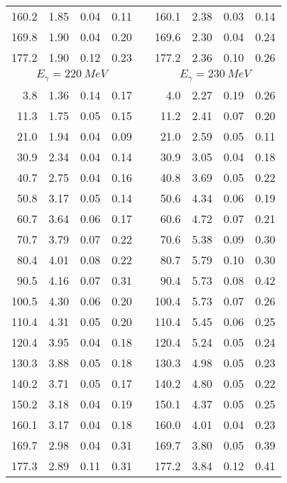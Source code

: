 \begin{table}[htbp]
\begin{center}
\begin{tabular}{|r|r|c|c|l|r|r|c|c|}
160.2 &  1.85 &  0.04 &  0.11 & & 160.1 &  2.38 &  0.03 &  0.14 \\ 
169.8 &  1.90 &  0.04 &  0.20 & & 169.6 &  2.30 &  0.04 &  0.24 \\ 
177.2 &  1.90 &  0.12 &  0.23 & & 177.2 &  2.36 &  0.10 &  0.26 \\ 
\hline 
\hline 
\multicolumn{4}{|c|}{ $E_{\gamma}=220~MeV$} & & 
\multicolumn{4}{c|}{ $E_{\gamma}=230~MeV$} \\ 
\cline{1-4} 
\cline{6-9} 
  3.8 &  1.36 &  0.14 &  0.17 & &   4.0 &  2.27 &  0.19 &  0.26 \\ 
 11.3 &  1.75 &  0.05 &  0.15 & &  11.2 &  2.41 &  0.07 &  0.20 \\ 
 21.0 &  1.94 &  0.04 &  0.09 & &  21.0 &  2.59 &  0.05 &  0.11 \\ 
 30.9 &  2.34 &  0.04 &  0.14 & &  30.9 &  3.05 &  0.04 &  0.18 \\ 
 40.7 &  2.75 &  0.04 &  0.16 & &  40.8 &  3.69 &  0.05 &  0.22 \\ 
 50.8 &  3.17 &  0.05 &  0.14 & &  50.6 &  4.34 &  0.06 &  0.19 \\ 
 60.7 &  3.64 &  0.06 &  0.17 & &  60.6 &  4.72 &  0.07 &  0.21 \\ 
 70.7 &  3.79 &  0.07 &  0.22 & &  70.6 &  5.38 &  0.09 &  0.30 \\ 
 80.4 &  4.01 &  0.08 &  0.22 & &  80.7 &  5.79 &  0.10 &  0.30 \\ 
 90.5 &  4.16 &  0.07 &  0.31 & &  90.4 &  5.73 &  0.08 &  0.42 \\ 
100.5 &  4.30 &  0.06 &  0.20 & & 100.4 &  5.73 &  0.07 &  0.26 \\ 
110.4 &  4.31 &  0.05 &  0.20 & & 110.4 &  5.45 &  0.06 &  0.25 \\ 
120.4 &  3.95 &  0.04 &  0.18 & & 120.4 &  5.24 &  0.05 &  0.24 \\ 
130.3 &  3.88 &  0.05 &  0.18 & & 130.3 &  4.98 &  0.05 &  0.23 \\ 
140.2 &  3.71 &  0.05 &  0.17 & & 140.2 &  4.80 &  0.05 &  0.22 \\ 
150.2 &  3.18 &  0.04 &  0.19 & & 150.1 &  4.37 &  0.05 &  0.25 \\ 
160.1 &  3.17 &  0.04 &  0.18 & & 160.0 &  4.01 &  0.04 &  0.23 \\ 
169.7 &  2.98 &  0.04 &  0.31 & & 169.7 &  3.80 &  0.05 &  0.39 \\ 
177.3 &  2.89 &  0.11 &  0.31 & & 177.2 &  3.84 &  0.12 &  0.41 \\ 
\cline{1-4} 
\cline{6-9} 
\end{tabular} 

\end{center} 
\end{table}
